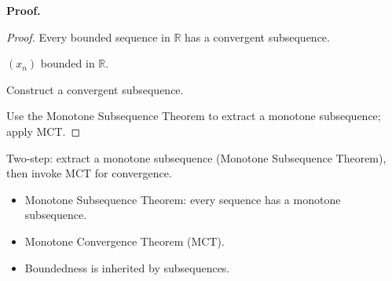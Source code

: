\noindent
\textbf{Proof.}
\begin{proof}
\Claim Every bounded sequence in $\mathbb{R}$ has a convergent subsequence.

\Given $(x_n)$ bounded in $\mathbb{R}$.

\Goal Construct a convergent subsequence.

\Strategy Use the Monotone Subsequence Theorem to extract a monotone
subsequence; apply MCT.

\medskip




\end{proof}

\begin{remark*}
Two-step: extract a monotone subsequence (Monotone Subsequence Theorem),
then invoke MCT for convergence.
\end{remark*}

\begin{remark*}[Dependencies]
\begin{itemize}
  \item Monotone Subsequence Theorem: every sequence has a monotone subsequence.
  \item Monotone Convergence Theorem (MCT).
  \item Boundedness is inherited by subsequences.
\end{itemize}
\end{remark*}
